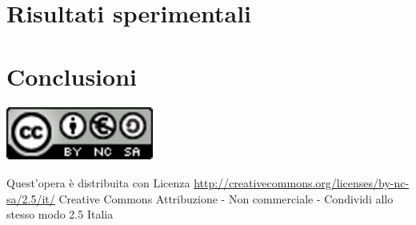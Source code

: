\documentclass[a4paper,12pt]{toptesi}
\begin{document}
\chapter*{Risultati sperimentali}


\chapter*{Conclusioni}




\vfill
\begin{center}
\includegraphics{logo/licenza.eps}
\end{center}
\tiny{Quest'opera è distribuita con Licenza \url{http://creativecommons.org/licenses/by-nc-sa/2.5/it/} Creative Commons Attribuzione - Non commerciale - Condividi allo stesso modo 2.5 Italia}
\end{document}
